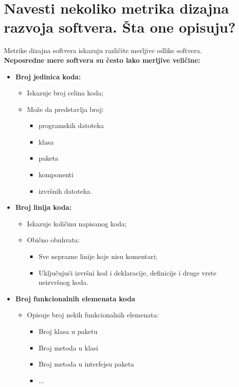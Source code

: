 \documentclass[a4paper]{article}
\begin{document}
\section{Navesti nekoliko metrika dizajna razvoja softvera. Šta one opisuju?}
  
  Metrike dizajna softvera iskazuju različite merljive odlike softvera.\\
  
  \textbf{Neposredne mere softvera su često lako merljive veličine:}
  \begin{itemize}
    \item \textbf{Broj jedinica koda:}
      \begin{itemize}
        \item Iskazuje broj celina koda;
        \item Može da predstavlja broj:
          \begin{itemize}
            \item programskih datoteka 
            \item klasa
            \item paketa
            \item komponenti
            \item izvršnih datoteka.
          \end{itemize}
    \end{itemize}
    \item \textbf{Broj linija koda:}
      \begin{itemize}
        \item Iskazuje količinu napisanog koda;
        \item Obično obuhvata:
          \begin{itemize}
            \item Sve neprazne linije koje nisu komentari;
            \item Uključujući izvršni kod i deklaracije, definicije i druge vrste neizvršnog koda.
          \end{itemize}
      \end{itemize}
    \item \textbf{Broj funkcionalnih elemenata koda}
      \begin{itemize}
        \item Opisuje broj nekih funkcionalnih elemenata:
          \begin{itemize}
            \item Broj klasa u paketu
            \item Broj metoda u klasi
            \item Broj metoda u interfejsu paketa 
            \item ...
          \end{itemize}
      \end{itemize}
  \end{itemize}
\end{document}
